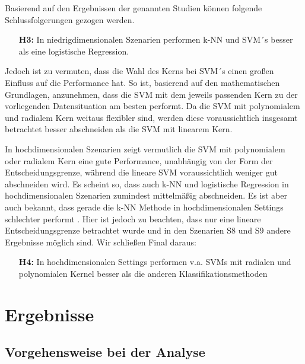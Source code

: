 \documentclass[
]{article}
\begin{document}
Basierend auf den Ergebnissen der genannten Studien können folgende
Schlussfolgerungen gezogen werden.

\begin{minipage}{0.9\linewidth}
\begin{itemize}[leftmargin=0.1\linewidth]
\item[\textbf{H3:}] In niedrigdimensionalen Szenarien performen k-NN und SVM´s besser als eine logistische Regression.
\end{itemize}
\end{minipage}

Jedoch ist zu vermuten, dass die Wahl des Kerns bei SVM´s einen großen
Einfluss auf die Performance hat. So ist, basierend auf den
mathematischen Grundlagen, anzunehmen, dass die SVM mit dem jeweils
passenden Kern zu der vorliegenden Datensituation am besten performt. Da
die SVM mit polynomialem und radialem Kern weitaus flexibler sind,
werden diese voraussichtlich insgesamt betrachtet besser abschneiden als
die SVM mit linearem Kern.\newline

In hochdimensionalen Szenarien zeigt vermutlich die SVM mit polynomialem
oder radialem Kern eine gute Performance, unabhängig von der Form der
Entscheidungsgrenze, während die lineare SVM voraussichtlich weniger gut
abschneiden wird. Es scheint so, dass auch k-NN und logistische
Regression in hochdimensionalen Szenarien zumindest mittelmäßig
abschneiden. Es ist aber auch bekannt, dass gerade die k-NN Methode in
hochdimensionalen Settings schlechter performt
\parencite{jamesIntroductionStatisticalLearning2021}. Hier ist jedoch zu
beachten, dass nur eine lineare Entscheidungsgrenze betrachtet wurde und
in den Szenarien S8 und S9 andere Ergebnisse möglich sind. Wir schließen
Final daraus:

\begin{minipage}{0.9\linewidth}
\begin{itemize}[leftmargin=0.1\linewidth]
\item[\textbf{H4:}] In hochdimensionalen Settings performen v.a. SVMs mit radialen und polynomialen Kernel besser als die anderen Klassifikationsmethoden
\end{itemize}
\end{minipage}
\section{Ergebnisse}

\subsection{Vorgehensweise bei der Analyse}
\end{document}
